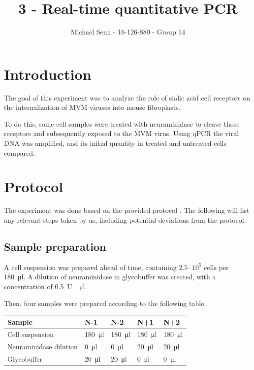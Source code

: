 \documentclass[a4paper,english]{scrreprt}
\title{3 - Real-time quantitative PCR}
\author{Michael Senn \maillink{michael.senn@students.unibe.ch} - 16-126-880 - Group 14}
\date{\printdate}
\begin{document}
\maketitle

\chapter{Introduction}

The goal of this experiment was to analyze the role of sialic acid cell
receptors on the internalization of MVM viruses into mouse fibroplasts.

To do this, some cell samples were treated with neuraminidase to cleave those
receptors and subsequently exposed to the MVM virus. Using qPCR the viral DNA
was amplified, and its initial quantity in treated and untreated cells compared.

\chapter{Protocol}

The experiment was done based on the provided protocol \cite{skriptv3}. The
following will list any relevant steps taken by us, including potential
deviations from the protocol.

\section{Sample preparation}

A cell suspension was prepared ahead of time, containing $2.5 \cdot 10^5$ cells
per \SI{180}{\ul}. A dilution of neuraminidase in glycobuffer was created, with
a concentration of \SI{0.5}{U \per \ul}.

Then, four samples were prepared according to the following table.
\\

\begin{tabu}{lllll}
	\toprule
	Sample & N-1 & N-2 & N+1 & N+2 \\
	\midrule
	Cell suspension & \SI{180}{\ul} & \SI{180}{\ul} & \SI{180}{\ul} & \SI{180}{\ul} \\
	Neuraminidase dilution & \SI{0}{\ul} & \SI{0}{\ul} & \SI{20}{\ul} & \SI{20}{\ul} \\
	Glycobuffer & \SI{20}{\ul} & \SI{20}{\ul} & \SI{0}{\ul} & \SI{0}{\ul} \\
	\bottomrule
\end{tabu}
\\
\end{document}

